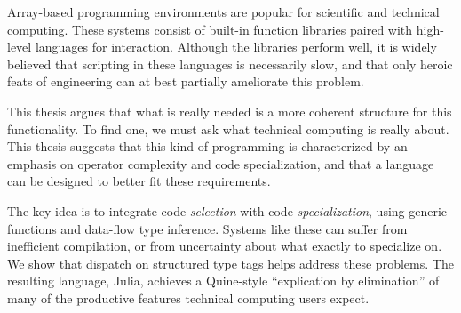 % 
% 
%

Array-based programming environments are popular for scientific and
technical computing.
These systems consist of built-in function libraries paired with high-level
languages for interaction.
Although the libraries perform well, it is widely believed that scripting in these
languages is necessarily slow, and that only heroic feats of engineering can at
best partially ameliorate this problem.

This thesis  argues that what is really needed is a more coherent
structure for this functionality.
To find one, we must ask what technical computing is really about.
This thesis suggests that this kind of programming is characterized by an emphasis on operator
complexity and code specialization, and that a language can be designed to
better fit these requirements.

The key idea is to integrate code \emph{selection} with code \emph{specialization},
using generic functions and data-flow type inference.
Systems like these can suffer from inefficient compilation, or from
uncertainty about what exactly to specialize on.
We show that dispatch on structured type tags helps address these problems.
The resulting language, Julia, achieves a Quine-style
``explication by elimination'' of many of the productive features
technical computing users expect.








